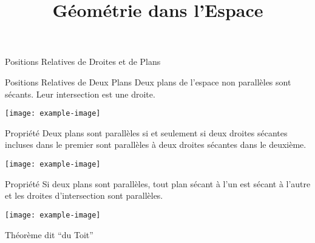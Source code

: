 \documentclass{cours}
\title{Géométrie dans l'Espace}
\begin{document}

    \begin{Gpartie}{Positions Relatives de Droites et de Plans} 
        \begin{Spartie}{Positions Relatives de Deux Plans} 
            Deux plans de l'espace non parallèles sont sécants. Leur intersection est une droite.
            \begin{center}
                    \texttt{[image: example-image]}
                \parbox{\linewidth}{}
            \end{center}
            \begin{SSpartie}{Propriété} 
                Deux plans sont parallèles si et seulement si deux droites sécantes incluses dans le premier sont parallèles à deux droites sécantes dans le deuxième.
                \begin{center}
                        \texttt{[image: example-image]}
                    \parbox{\linewidth}{}
                \end{center}
            \end{SSpartie}
            \pagebreak
            \begin{SSpartie}{Propriété} 
                Si deux plans sont parallèles, tout plan sécant à l'un est sécant à l'autre et les droites d'intersection sont parallèles.
                \begin{center}
                        \texttt{[image: example-image]}
                    \parbox{\linewidth}{}
                \end{center}
            \end{SSpartie}
            \begin{SSpartie}{Théorème dit ``du Toit''} 

\end{SSpartie}
\end{Spartie}
\end{Gpartie}
\end{document}
